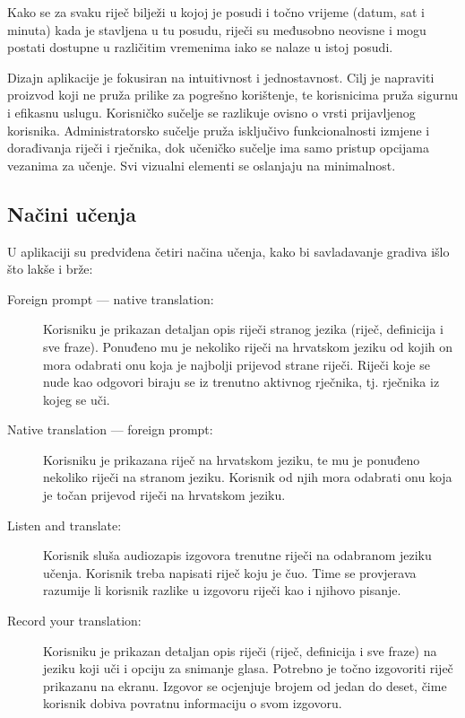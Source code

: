 Kako se za svaku riječ bilježi u kojoj je posudi i točno vrijeme (datum, sat i minuta) kada je stavljena u tu posudu, riječi su međusobno neovisne i mogu postati dostupne u različitim vremenima iako se nalaze u istoj posudi. 

Dizajn aplikacije je fokusiran na intuitivnost i jednostavnost. Cilj je napraviti proizvod koji ne pruža prilike
za pogrešno korištenje, te korisnicima pruža sigurnu i efikasnu uslugu. Korisničko sučelje se razlikuje
ovisno o vrsti prijavljenog korisnika. Administratorsko sučelje pruža isključivo funkcionalnosti izmjene i dorađivanja
riječi i rječnika, dok učeničko sučelje ima samo pristup opcijama vezanima za učenje. Svi vizualni elementi se
oslanjaju na minimalnost.

\subsection{Načini učenja} 

U aplikaciji su predviđena četiri načina učenja, kako bi savladavanje gradiva išlo što lakše i brže:
\begin{description}
	\item[Foreign prompt --- native translation:] Korisniku je prikazan detaljan opis riječi stranog jezika (riječ, definicija i sve fraze). Ponuđeno mu je nekoliko riječi na hrvatskom jeziku od 
	kojih on mora odabrati onu koja je najbolji prijevod strane riječi. Riječi koje se nude kao odgovori biraju se iz trenutno aktivnog rječnika, tj. rječnika iz kojeg se uči. 

	\item[Native translation --- foreign prompt:] Korisniku je prikazana riječ na hrvatskom jeziku, te mu je ponuđeno nekoliko riječi na stranom jeziku. 
	Korisnik od njih mora odabrati onu koja je točan prijevod riječi na hrvatskom jeziku.

	\item[Listen and translate:] Korisnik sluša audiozapis izgovora trenutne riječi na odabranom jeziku učenja. Korisnik treba napisati 
	riječ koju je čuo. Time se provjerava razumije li korisnik razlike u izgovoru riječi kao i njihovo pisanje.

	\item[Record your translation:] Korisniku je prikazan detaljan opis riječi (riječ, definicija i sve fraze) na jeziku koji uči i opciju za snimanje glasa. Potrebno je točno 
	izgovoriti riječ prikazanu na ekranu. Izgovor se ocjenjuje brojem od jedan do deset, čime korisnik dobiva povratnu informaciju o svom izgovoru.
\end{description}

